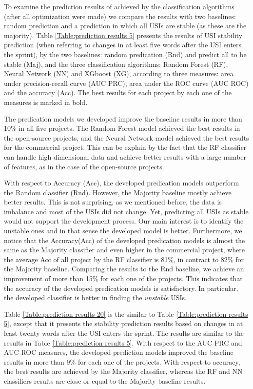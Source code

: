 To examine the prediction results of achieved by the classification algorithms (after all optimization were made) we compare the results with two baselines: random prediction and a prediction in which all USIs are stable (as these are the majority). 
Table \ref{Table:prediction results 5} presents the results of USI stability prediction (when referring to changes in at least five words after the USI enters the sprint), by the two baselines: random predication (Rnd) and predict all to be stable (Maj), and the three classification algorithms: Random Forest (RF), Neural Network (NN) and XGboost (XG), according to three measures: area under precision-recall curve (AUC PRC), area under the ROC curve (AUC ROC) and the accuracy (Acc). The best results for each project by each one of the measures is marked in bold.

The predication models we developed improve the baseline results in more than 10\% in all five projects. The Random Forest model achieved the best results in the open-source projects, and the Neural Network model achieved the best results for the commercial project. This can be explain by the fact that the RF classifier can handle high dimensional data and achieve better results with a large number of features, as in the case of the open-source projects.

With respect to Accuracy (Acc), the developed predication models outperform the Random classifier (Rnd). However, the Majority baseline mostly achieve better results. This is not surprising, as we mentioned before, the data is imbalance and most of the USIs did not change. Yet, predicting all USIs as stable would not support the development process. Our main interest is to identify the unstable ones and in that sense the developed model is better. Furthermore, we notice that the Accuracy(Acc) of the developed predication models is almost the same as the Majority classifier and even higher in the commercial project, where the average Acc of all project by the RF classifier is 81\%, in contract to 82\% for the Majority baseline. Comparing the results to the Rnd baseline, we achieve an improvement of more than 15\% 
for each one of the projects. This indicates that the accuracy of the developed predication models is satisfactory. In particular, the developed classifier is better in finding the \emph{unstable} USIs.


Table \ref{Table:prediction results 20} is the similar to Table \ref{Table:prediction results 5}, except that it presents the stability prediction results based on changes in at least twenty words after the USI enters the sprint. The results are similar to the results in Table \ref{Table:prediction results 5}. With respect to the AUC PRC and AUC ROC measures, the developed prediction models improved the baseline results in more than 9\% for each one of the projects.
With respect to accuracy, the best results are achieved by the Majority classifier, whereas the RF and NN classifiers results are close or equal to the Majority baseline results. 

